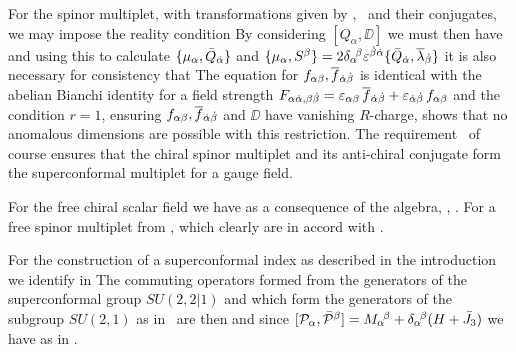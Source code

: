 For the spinor multiplet, with transformations given by \QVfree, \QbarV\ and their
conjugates, we may impose the reality condition
\eqn{}
By considering $[Q_\alpha,\DD]$ we must then have
\eqn{}
and using this to calculate $\{\mu_{\alpha},\bar Q_{\smash{{\dot \alpha}}}\}$ and
$\{\mu_{\alpha},S^\beta\} = 2 \delta_{\alpha}{\!}^\beta \varepsilon^{{\dot \beta}{\dot \alpha}}\{\bar Q_{\smash{{\dot \alpha}}},
{\overline \lambda}_{\smash{{\dot \beta}}}\}$ it is also necessary for consistency that
\eqn{}
The equation for $f_{\alpha\beta},{\overline f}{}_{\smash{{\dot \alpha}{\dot \beta}}}$ is identical
with the abelian Bianchi identity for a field strength
$F_{\smash{{\alpha}{\dot \alpha},\beta{\dot \beta}}}= \varepsilon_{\alpha\beta}\,{\overline f}{}_{\smash{{\dot \alpha}{\dot \beta}}}
+ \varepsilon_{\smash{{\dot \alpha}{\dot \beta}}}\, f_{\alpha\beta}$ and the condition $r=1$, ensuring
$f_{\alpha\beta},{\overline f}{}_{\smash{{\dot \alpha}{\dot \beta}}}$ and $\DD$ have vanishing $R$-charge, 
shows that no anomalous dimensions are possible with this restriction. 
The requirement \realD\ of course ensures that 
the chiral spinor multiplet and its anti-chiral conjugate form the superconformal 
multiplet for a gauge field.

For the free chiral scalar field  we have
\eqn{}
as a consequence of the algebra, \QSfree, \QbarS. For a free spinor multiplet from
\QVfree, \QbarV
\eqn{}
which clearly are in accord with \consis.

For the construction of a superconformal index as described in the introduction
we identify in \QQH
\eqn{}
The commuting operators formed from the generators of the superconformal group
$SU(2,2|1)$ and which form the generators of the subgroup $SU(2,1)$ as in \suto\ are 
then
\eqn{}
and since $[{\cal P}_\alpha , {\bar {{\cal P}}}^\beta ] = M_\alpha{}^{\! \beta} + 
\delta_\alpha{}^{\! \beta} ( H + {\bar J}_3 ) $ we have
\eqn{}
as in \RR.
 
